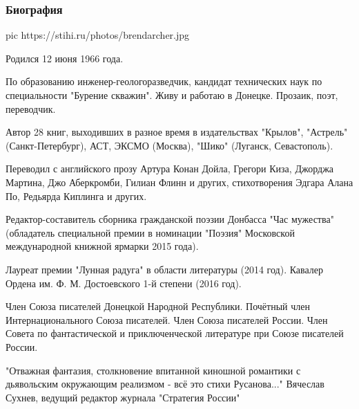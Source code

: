 
 
 

\subsubsection{Биография}
\label{sec:poetry.rus.dnr.vladislav_rusanov.bio}

\ifcmt
pic https://stihi.ru/photos/brendarcher.jpg
\fi

Родился 12 июня 1966 года.

По образованию инженер-геологоразведчик, кандидат технических наук по
специальности "Бурение скважин". Живу и работаю в Донецке.  Прозаик, поэт,
переводчик.

Автор 28 книг, выходивших в разное время в издательствах "Крылов", "Астрель"
(Санкт-Петербург), АСТ, ЭКСМО (Москва), "Шико" (Луганск, Севастополь).

Переводил с английского прозу Артура Конан Дойла, Грегори Киза, Джорджа
Мартина, Джо Аберкромби, Гилиан Флинн и других, стихотворения Эдгара Алана По,
Редьярда Киплинга и других.

Редактор-составитель сборника гражданской поэзии Донбасса "Час мужества"
(обладатель специальной премии в номинации "Поэзия" Московской международной
книжной ярмарки 2015 года).

Лауреат премии "Лунная радуга" в области литературы (2014 год).  Кавалер Ордена
им. Ф. М. Достоевского 1-й степени (2016 год).

Член Союза писателей Донецкой Народной Республики. Почётный член
Интернационального Союза писателей. Член Союза писателей России. Член Совета по
фантастической и приключенческой литературе при Союзе писателей России.

"Отважная фантазия, столкновение впитанной киношной романтики с дьявольским
окружающим реализмом - всё это стихи Русанова..." Вячеслав Сухнев, ведущий
редактор журнала "Стратегия России"

